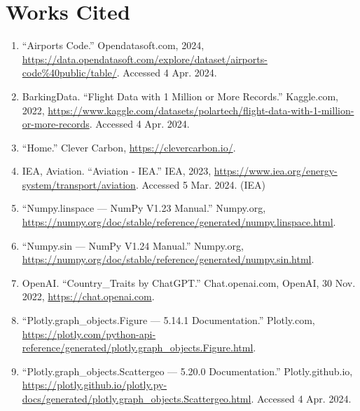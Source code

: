 \documentclass[11pt]{article}
\begin{document}
\section*{Works Cited}

\begin{enumerate}
    \item ``Airports Code.'' Opendatasoft.com, 2024, \url{https://data.opendatasoft.com/explore/dataset/airports-code\%40public/table/}. Accessed 4 Apr. 2024.
    \item BarkingData. ``Flight Data with 1 Million or More Records.'' Kaggle.com, 2022, \url{https://www.kaggle.com/datasets/polartech/flight-data-with-1-million-or-more-records}. Accessed 4 Apr. 2024.
    \item ``Home.'' Clever Carbon, \url{https://clevercarbon.io/}.
    \item IEA, Aviation. ``Aviation - IEA.'' IEA, 2023, \url{https://www.iea.org/energy-system/transport/aviation}. Accessed 5 Mar. 2024. (IEA)
    \item ``Numpy.linspace — NumPy V1.23 Manual.'' Numpy.org, \url{https://numpy.org/doc/stable/reference/generated/numpy.linspace.html}.
    \item ``Numpy.sin — NumPy V1.24 Manual.'' Numpy.org, \url{https://numpy.org/doc/stable/reference/generated/numpy.sin.html}.
    \item OpenAI. ``Country\_Traits by ChatGPT.'' Chat.openai.com, OpenAI, 30 Nov. 2022, \url{https://chat.openai.com}.
    \item ``Plotly.graph\_objects.Figure — 5.14.1 Documentation.'' Plotly.com, \url{https://plotly.com/python-api-reference/generated/plotly.graph_objects.Figure.html}.
    \item ``Plotly.graph\_objects.Scattergeo — 5.20.0 Documentation.'' Plotly.github.io, \url{https://plotly.github.io/plotly.py-docs/generated/plotly.graph_objects.Scattergeo.html}. Accessed 4 Apr. 2024.
\end{enumerate}
\end{document}

